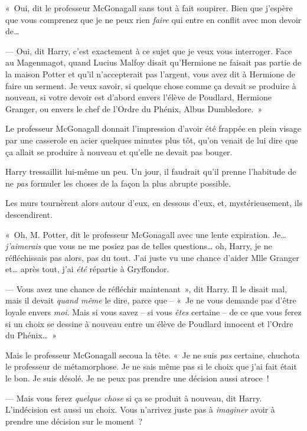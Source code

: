«~Oui, dit le professeur McGonagall sans tout à fait soupirer.
Bien que j'espère que vous comprenez que je ne peux rien \emph{faire} qui entre en conflit avec mon devoir de…

--- Oui, dit Harry, c'est exactement à ce sujet que je veux vous interroger.
Face au Magenmagot, quand Lucius Malfoy disait qu'Hermione ne faisait pas partie de la maison Potter et qu'il n'accepterait pas l'argent, vous avez dit à Hermione de faire un serment.
Je veux savoir, si quelque chose comme ça devait se produire à nouveau, si votre devoir est d'abord envers l'élève de Poudlard, Hermione Granger, ou envers le chef de l'Ordre du Phénix, Albus Dumbledore.~»

Le professeur McGonagall donnait l'impression d'avoir été frappée en plein visage par une casserole en acier quelques minutes plus tôt, qu'on venait de lui dire que ça allait se produire à nouveau et qu'elle ne devait pas bouger.

Harry tressaillit lui-même un peu.
Un jour, il faudrait qu'il prenne l'habitude de ne \emph{pas} formuler les choses de la façon la plus abrupte possible.

Les murs tournèrent alors autour d'eux, en dessous d'eux, et, mystérieusement, ils descendirent.

«~Oh, M. Potter, dit le professeur McGonagall avec une lente expiration.
Je… \emph{j'aimerais} que vous ne me posiez pas de telles questions… oh, Harry, je ne réfléchissais pas alors, pas du tout.
J'ai juste vu une chance d'aider Mlle Granger et… après tout, j'ai \emph{été} répartie à Gryffondor.

--- Vous avez une chance de réfléchir maintenant~», dit Harry.
Il le disait mal, mais il devait \emph{quand même} le dire, parce que -- «~Je ne vous demande pas d'être loyale envers \emph{moi}.
Mais si vous savez -- si vous \emph{êtes} certaine -- de ce que vous ferez si un choix se dessine à nouveau entre un élève de Poudlard innocent et l'Ordre du Phénix…~»

Mais le professeur McGonagall secoua la tête.
«~Je ne suis \emph{pas} certaine, chuchota le professeur de métamorphose.
Je ne sais même pas si le choix que j'ai fait était le bon.
Je suis désolé.
Je ne peux pas prendre une décision aussi atroce~!

--- Mais vous ferez \emph{quelque chose} si ça se produit à nouveau, dit Harry.
L'indécision est aussi un choix.
Vous n'arrivez juste pas à \emph{imaginer} avoir à prendre une décision sur le moment~?

